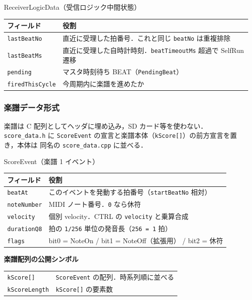 \documentclass[lualatex,book,paper=a4paper,jafontsize=11.5pt,jafontscale=1.05]{jlreq}
\begin{document}
\begin{apibox}{ReceiverLogicData（受信ロジック中間状態）}
\begin{tabular}{l p{}}
\toprule
\textbf{フィールド} & \textbf{役割} \\
\midrule
\texttt{lastBeatNo}     & 直近に受理した拍番号．これと同じ \texttt{beatNo} は重複排除 \\
\texttt{lastBeatMs}     & 直近に受理した自時計時刻．\texttt{beatTimeoutMs} 超過で SelfRun 遷移 \\
\texttt{pending}        & マスタ時刻待ち BEAT（\texttt{PendingBeat}） \\
\texttt{firedThisCycle} & 今周期内に楽譜を進めたか \\
\bottomrule
\end{tabular}
\end{apibox}

\subsubsection{楽譜データ形式}

楽譜は C 配列としてヘッダに埋め込み，SD カード等を使わない．\texttt{score\_data.h} に
\texttt{ScoreEvent} の宣言と楽譜本体（\texttt{kScore[]}）の前方宣言を置き，本体は
同名の \texttt{score\_data.cpp} に並べる．

\begin{apibox}{ScoreEvent（楽譜 1 イベント）}
\begin{tabular}{l p{}}
\toprule
\textbf{フィールド} & \textbf{役割} \\
\midrule
\texttt{beatAt}     & このイベントを発動する拍番号（\texttt{startBeatNo} 相対） \\
\texttt{noteNumber} & MIDI ノート番号．\texttt{0} なら休符 \\
\texttt{velocity}   & 個別 velocity．CTRL の \texttt{velocity} と乗算合成 \\
\texttt{durationQ8} & 拍の \texttt{1/256} 単位の発音長（\texttt{256 = 1} 拍） \\
\texttt{flags}      & bit0 = NoteOn / bit1 = NoteOff（拡張用） / bit2 = 休符 \\
\bottomrule
\end{tabular}

\medskip
\textbf{楽譜配列の公開シンボル}
\begin{tabular}{l p{}}
\texttt{kScore[]}    & \texttt{ScoreEvent} の配列．時系列順に並べる \\
\texttt{kScoreLength}& \texttt{kScore[]} の要素数 \\
\end{tabular}
\end{apibox}
\end{document}
